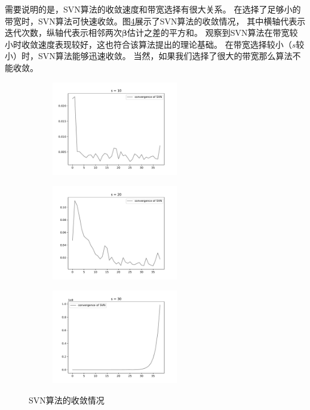 需要说明的是，SVN算法的收敛速度和带宽选择有很大关系。
在选择了足够小的带宽时，SVN算法可快速收敛。图\ref{svn-demo}展示了SVN算法的收敛情况，
其中横轴代表示迭代次数，纵轴代表示相邻两次$\bm{\beta}$估计之差的平方和。
观察到SVN算法在带宽较小时收敛速度表现较好，这也符合该算法提出的理论基础。
在带宽选择较小（$s$较小）时，SVN算法能够迅速收敛。
当然，如果我们选择了很大的带宽那么算法不能收敛。
\begin{figure}[H]
    \centering
    \begin{subfigure}[t]{0.3\textwidth}\label{svn-demo1}
    \includegraphics[width=5.5cm]{pics/chapter2/svn-con-1.pdf}
    \end{subfigure}
    \begin{subfigure}[t]{0.3\textwidth}\label{svn-demo2}
    \includegraphics[width=5.5cm]{pics/chapter2/svn-con-2.pdf}
    \end{subfigure}
    \begin{subfigure}[t]{0.3\textwidth}\label{svn-demo3}
    \includegraphics[width=5.5cm]{pics/chapter2/svn-con-3.pdf}
    \end{subfigure}
    \caption{ \small SVN算法的收敛情况}
    \label{svn-demo}
\end{figure}

